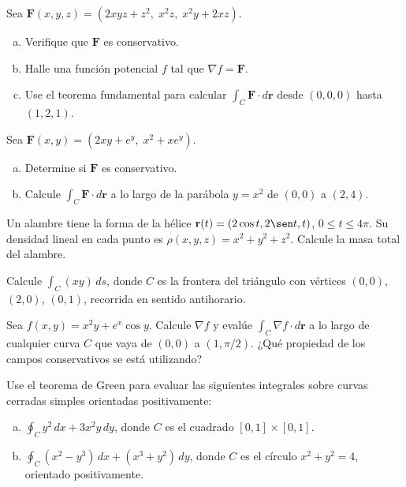\begin{prob}
Sea \(\mathbf{F}(x,y,z) = (2xyz + z^2,\; x^2z,\; x^2y + 2xz)\).
\begin{enumerate}[a)]
  \item Verifique que \(\mathbf{F}\) es conservativo.
  \item Halle una función potencial \(f\) tal que \(\nabla f = \mathbf{F}\).
  \item Use el teorema fundamental para calcular
  \(\displaystyle\int_C \mathbf{F}\cdot d\mathbf{r}\) desde
  \((0,0,0)\) hasta \((1,2,1)\).
\end{enumerate}
\end{prob}

\begin{prob}
Sea \(\mathbf{F}(x,y) = (2xy + e^y,\; x^2 + xe^y)\).
\begin{enumerate}[a)]
  \item Determine si \(\mathbf{F}\) es conservativo.
  \item Calcule \(\displaystyle\int_C \mathbf{F}\cdot d\mathbf{r}\) a lo largo de
  la parábola \(y = x^2\) de \((0,0)\) a \((2,4)\).
\end{enumerate}
\end{prob}

\begin{prob}
Un alambre tiene la forma de la hélice \(\mathbf{r}(t) = (2\cos t,
2\sen t, t)\), \(0 \le t \le 4\pi\). Su densidad lineal en cada punto
es \(\rho(x,y,z) = x^2 + y^2 + z^2\). Calcule la masa total del alambre.
\end{prob}

\begin{prob}
Calcule \(\displaystyle \int_C (xy)\,ds\), donde \(C\) es la frontera
del triángulo con vértices \((0,0)\), \((2,0)\), \((0,1)\), recorrida
en sentido antihorario.
\end{prob}

\begin{prob}
Sea \(f(x,y) = x^2 y + e^x \cos y\). Calcule \(\nabla f\) y evalúe
\(\displaystyle \int_C \nabla f \cdot d\mathbf{r}\) a lo largo de
cualquier curva \(C\) que vaya de \((0,0)\) a \((1,\pi/2)\).
¿Qué propiedad de los campos conservativos se está utilizando?
\end{prob}

\begin{prob}
Use el teorema de Green para evaluar las siguientes integrales sobre curvas
cerradas simples orientadas positivamente:
\begin{enumerate}[a)]
  \item \(\displaystyle\oint_C y^2\,dx + 3x^2y\,dy\), donde \(C\) es el
  cuadrado \([0,1]\times[0,1]\).
  \item \(\displaystyle\oint_C (x^2 - y^3)\,dx + (x^3 + y^2)\,dy\), donde
  \(C\) es el círculo \(x^2 + y^2 = 4\), orientado positivamente.
\end{enumerate}
\end{prob}

